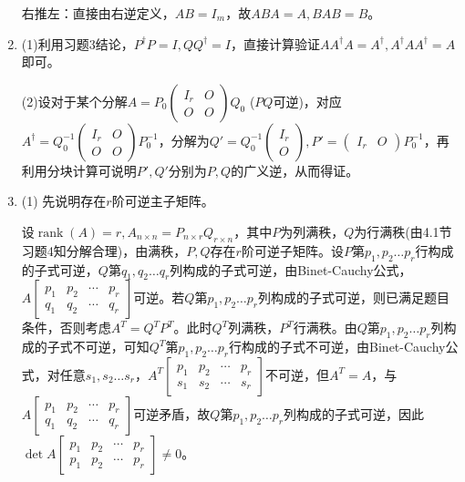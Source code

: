 \documentclass[a4paper,UTF8,fontset=windows]{ctexart}
\DeclareMathOperator{\rank}{rank}
\begin{document}
\begin{enumerate}
右推左：直接由右逆定义，$AB=I_m$，故$ABA=A,BAB=B$。

\item
(1)利用习题3结论，$P^\dagger P=I,QQ^\dagger=I$，直接计算验证$AA^\dagger A=A^\dagger ,A^\dagger AA^\dagger=A$即可。

(2)设对于某个分解$A=P_0\begin{pmatrix}I_r&O\\O&O\end{pmatrix}Q_0$ ($PQ$可逆)，对应$A^\dagger=Q_0^{-1}\begin{pmatrix}I_r&O\\O&O\end{pmatrix}P_0^{-1}$，分解为$Q'=Q_0^{-1}\begin{pmatrix}I_r\\O\end{pmatrix},P'=\begin{pmatrix}I_r&O\end{pmatrix}P_0^{-1}$，再利用分块计算可说明$P',Q'$分别为$P,Q$的广义逆，从而得证。

\item
(1) 先说明存在$r$阶可逆主子矩阵。

设$\rank(A)=r,A_{n\times n}=P_{n\times r}Q_{r\times n}$，其中$P$为列满秩，$Q$为行满秩(由4.1节习题4知分解合理)，由满秩，$P,Q$存在$r$阶可逆子矩阵。设$P$第$p_1,p_2\dots p_r$行构成的子式可逆，$Q$第$q_1,q_2\dots q_r$列构成的子式可逆，由Binet-Cauchy公式，$A\begin{bmatrix}p_1&p_2&\cdots&p_r\\q_1&q_2&\cdots&q_r\end{bmatrix}$可逆。若$Q$第$p_1,p_2\dots p_r$列构成的子式可逆，则已满足题目条件，否则考虑$A^T=Q^TP^T$。此时$Q^T$列满秩，$P^T$行满秩。由$Q$第$p_1,p_2\dots p_r$列构成的子式不可逆，可知$Q^T$第$p_1,p_2\dots p_r$行构成的子式不可逆，由Binet-Cauchy公式，对任意$s_1,s_2\dots s_r$，$A^T\begin{bmatrix}p_1&p_2&\cdots&p_r\\s_1&s_2&\cdots&s_r\end{bmatrix}$不可逆，但$A^T=A$，与$A\begin{bmatrix}p_1&p_2&\cdots&p_r\\q_1&q_2&\cdots&q_r\end{bmatrix}$可逆矛盾，故$Q$第$p_1,p_2\dots p_r$列构成的子式可逆，因此$\det{A\begin{bmatrix}p_1&p_2&\cdots&p_r\\p_1&p_2&\cdots&p_r\end{bmatrix}}\ne0$。


\end{enumerate}
\end{document}
